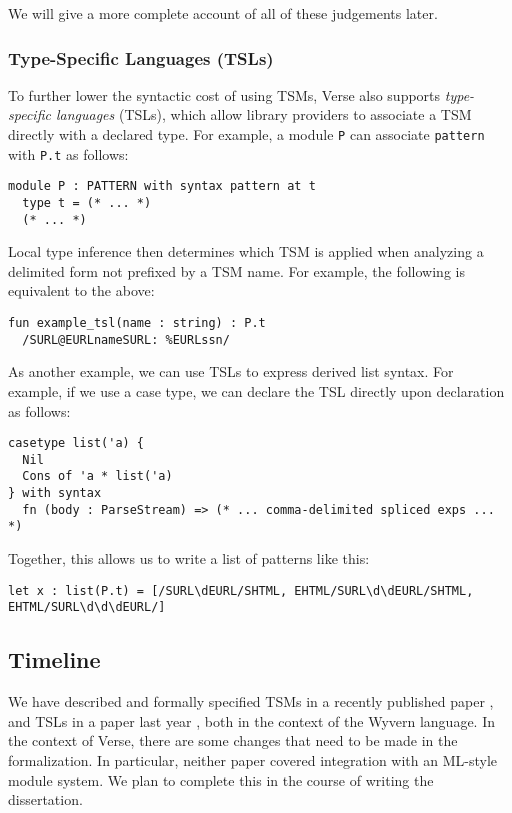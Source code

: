 We will give a more complete account of all of these judgements later.
\subsubsection{Type-Specific Languages (TSLs)}
To further lower the syntactic cost of using TSMs, Verse also  supports \emph{type-specific languages} (TSLs), which allow library providers to associate a TSM directly with a declared type. For example, a module \lstinline{P} can associate \lstinline{pattern} with \lstinline{P.t} as follows:
\begin{lstlisting}[numbers=none]
module P : PATTERN with syntax pattern at t
  type t = (* ... *)
  (* ... *)
\end{lstlisting}

 Local type inference then determines which TSM is applied when analyzing a delimited form not prefixed by a TSM name. For example, the following is equivalent to the above:
\begin{lstlisting}[numbers=none]
fun example_tsl(name : string) : P.t
  /SURL@EURLnameSURL: %EURLssn/
\end{lstlisting}

As another example, we can use TSLs to express derived list syntax. For example, if we use a case type, we can declare the TSL directly upon declaration as follows:
\begin{lstlisting}[numbers=none]
casetype list('a) {
  Nil
  Cons of 'a * list('a)
} with syntax
  fn (body : ParseStream) => (* ... comma-delimited spliced exps ... *)
\end{lstlisting}
Together, this allows us to write a list of patterns like this:
\begin{lstlisting}[numbers=none]
let x : list(P.t) = [/SURL\dEURL/SHTML, EHTML/SURL\d\dEURL/SHTML, EHTML/SURL\d\d\dEURL/]
\end{lstlisting}

\subsection{Timeline}\label{sec:syntax-timeline}
We have described and formally specified TSMs in a recently published paper \cite{sac15}, and TSLs in a paper last year \cite{TSLs}, both in the context of the Wyvern language. In the context of Verse, there are some changes that need to be made in the formalization. In particular, neither paper covered integration with an ML-style module system. We plan to complete this in the course of writing the dissertation. 

